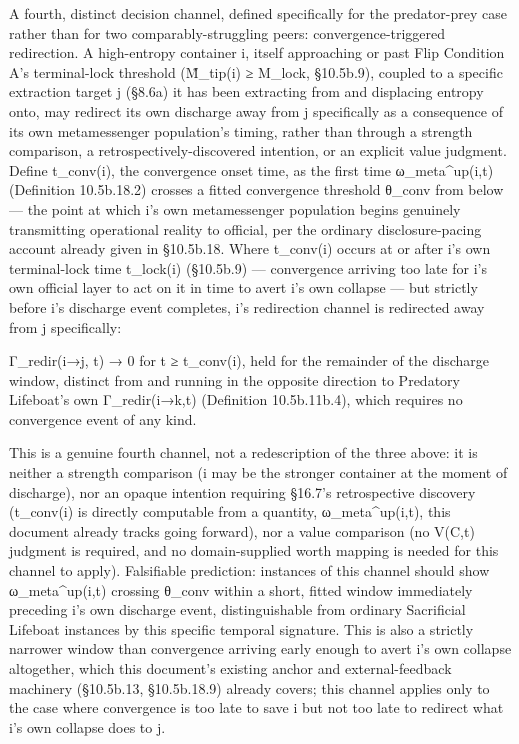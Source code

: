 \documentclass[
]{article}
\begin{document}
A fourth, distinct decision channel, defined specifically for the
predator-prey case rather than for two comparably-struggling peers:
convergence-triggered redirection. A high-entropy container i, itself
approaching or past Flip Condition A's terminal-lock threshold
(M̃\_tip(i) ≥ M\_lock, §10.5b.9), coupled to a specific extraction
target j (§8.6a) it has been extracting from and displacing entropy
onto, may redirect its own discharge away from j specifically as a
consequence of its own metamessenger population's timing, rather than
through a strength comparison, a retrospectively-discovered intention,
or an explicit value judgment. Define t\_conv(i), the convergence
onset time, as the first time ω\_meta\^{}up(i,t) (Definition
10.5b.18.2) crosses a fitted convergence threshold θ\_conv from below
---  the point at which i's own metamessenger population begins
genuinely transmitting operational reality to official, per the
ordinary disclosure-pacing account already given in §10.5b.18. Where
t\_conv(i) occurs at or after i's own terminal-lock time t\_lock(i)
(§10.5b.9)  ---  convergence arriving too late for i's own official
layer to act on it in time to avert i's own collapse  ---  but
strictly before i's discharge event completes, i's redirection channel
is redirected away from j specifically:

Γ\_redir(i→j, t) → 0 for t ≥ t\_conv(i), held for the remainder of the
discharge window, distinct from and running in the opposite direction
to Predatory Lifeboat's own Γ\_redir(i→k,t) (Definition 10.5b.11b.4),
which requires no convergence event of any kind.

This is a genuine fourth channel, not a redescription of the three
above: it is neither a strength comparison (i may be the stronger
container at the moment of discharge), nor an opaque intention
requiring §16.7's retrospective discovery (t\_conv(i) is directly
computable from a quantity, ω\_meta\^{}up(i,t), this document already
tracks going forward), nor a value comparison (no V(C,t) judgment is
required, and no domain-supplied worth mapping is needed for this
channel to apply). Falsifiable prediction: instances of this channel
should show ω\_meta\^{}up(i,t) crossing θ\_conv within a short, fitted
window immediately preceding i's own discharge event, distinguishable
from ordinary Sacrificial Lifeboat instances by this specific temporal
signature. This is also a strictly narrower window than convergence
arriving early enough to avert i's own collapse altogether, which this
document's existing anchor and external-feedback machinery (§10.5b.13,
§10.5b.18.9) already covers; this channel applies only to the case
where convergence is too late to save i but not too late to redirect
what i's own collapse does to j.
\end{document}

